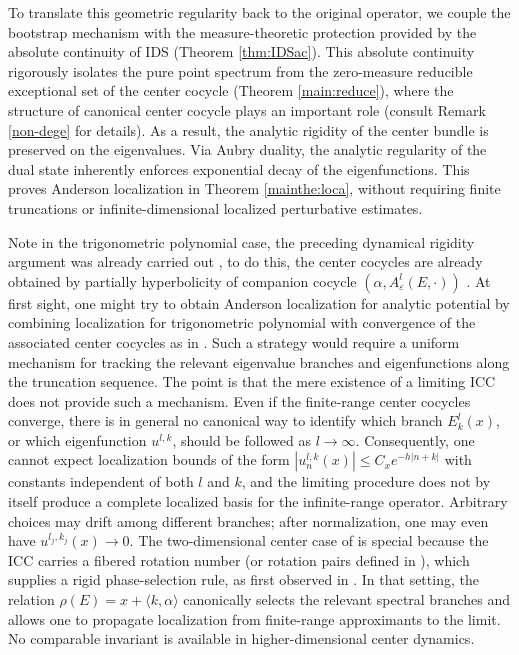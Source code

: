 \documentclass[reqno,11pt]{amsart}
\begin{document}
To translate this geometric regularity back to the original operator, we couple the bootstrap mechanism with the measure-theoretic protection provided by the absolute continuity of IDS (Theorem \ref{thm:IDSac}). This absolute continuity rigorously isolates the pure point spectrum from the zero-measure reducible exceptional set of the center cocycle (Theorem \ref{main:reduce}), where the structure of canonical center cocycle plays an important role (consult Remark \ref{non-dege} for details).  As a result, the analytic rigidity of the center bundle is  preserved on the  eigenvalues. Via Aubry duality, the analytic regularity of the dual state inherently enforces  exponential decay of the  eigenfunctions. This proves Anderson localization
in Theorem \ref{mainthe:loca}, without requiring finite
truncations or infinite-dimensional localized perturbative estimates.

Note in the trigonometric polynomial case, the preceding dynamical rigidity argument was already carried out \cite{WYZ}, to do this, the center cocycles are already obtained by partially hyperbolicity of   companion  cocycle $(\alpha,A^{l}_{\varepsilon}(E,\cdot))$ \cite{GJYZ}.
At first sight, one might try to obtain Anderson localization for analytic potential by combining localization for  trigonometric polynomial with convergence of the associated center cocycles as in \cite{GJ}. Such a strategy would require a uniform mechanism for tracking the relevant eigenvalue branches and eigenfunctions along the truncation sequence.
The point is that the mere existence of a limiting ICC does not provide such a mechanism. Even if the finite-range center cocycles converge, there is in general no canonical way to identify which branch $E_k^{l}(x)$, or which eigenfunction $u^{l,k}$, should be followed as $l\to\infty$. Consequently, one cannot expect localization bounds of the form
$
|u_n^{l,k}(x)| \le C_x e^{-h|n+k|}
$
with constants independent of both $l$ and $k$, and the limiting procedure does not by itself produce a complete localized basis for the infinite-range operator. Arbitrary choices may drift among different branches; after
normalization, one may even have
$u^{l_j,k_j}(x)\rightarrow 0$. 
The two-dimensional center case of \cite{GJ} is special because the ICC carries a fibered rotation number (or rotation pairs defined in \cite{GJ}), which supplies a rigid phase-selection rule, as first observed in \cite{AYZ}. In that setting, the relation $\rho(E)=x+\langle k,\alpha\rangle$
canonically selects the relevant spectral branches and allows one to propagate localization from finite-range approximants to the limit. No comparable invariant is available in higher-dimensional center dynamics.
\end{document}
